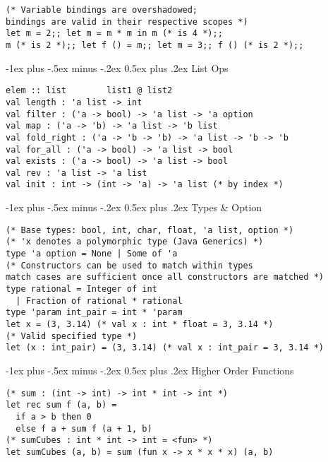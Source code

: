 \documentclass[12pt]{article}
\makeatletter
\renewcommand{\section}{\@startsection{section}{1}{0mm}%
                                    {-1ex plus -.5ex minus -.2ex}%
                                    {0.5ex plus .2ex}%
                                    {\normalfont\large\bfseries\color{header}}}
\makeatother
\begin{document}
\begin{multicols}{2}
\begin{lstlisting}
(* Variable bindings are overshadowed; 
bindings are valid in their respective scopes *)
let m = 2;; let m = m * m in m (* is 4 *);; 
m (* is 2 *);; let f () = m;; let m = 3;; f () (* is 2 *);;
    \end{lstlisting}
    
	\section{List Ops}
	\begin{lstlisting}
elem :: list        list1 @ list2
val length : 'a list -> int
val filter : ('a -> bool) -> 'a list -> 'a option 
val map : ('a -> 'b) -> 'a list -> 'b list
val fold_right : ('a -> 'b -> 'b) -> 'a list -> 'b -> 'b
val for_all : ('a -> bool) -> 'a list -> bool
val exists : ('a -> bool) -> 'a list -> bool
val rev : 'a list -> 'a list
val init : int -> (int -> 'a) -> 'a list (* by index *)
    \end{lstlisting}
    
    \columnbreak
    \section{Types \& Option}
    \begin{lstlisting}
(* Base types: bool, int, char, float, 'a list, option *)
(* 'x denotes a polymorphic type (Java Generics) *)
type 'a option = None | Some of 'a
(* Constructors can be used to match within types
match cases are sufficient once all constructors are matched *)
type rational = Integer of int
  | Fraction of rational * rational
type 'param int_pair = int * 'param
let x = (3, 3.14) (* val x : int * float = 3, 3.14 *)
(* Valid specified type *)
let (x : int_pair) = (3, 3.14) (* val x : int_pair = 3, 3.14 *)
    \end{lstlisting}
	
	\section{Higher Order Functions}
	\begin{lstlisting}
(* sum : (int -> int) -> int * int -> int *)
let rec sum f (a, b) =
  if a > b then 0
  else f a + sum f (a + 1, b)
(* sumCubes : int * int -> int = <fun> *)
let sumCubes (a, b) = sum (fun x -> x * x * x) (a, b)
	\end{lstlisting}


\end{multicols}
\end{document}
